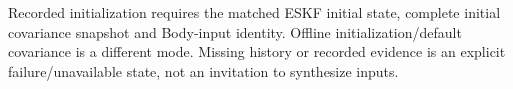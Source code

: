 Recorded initialization requires the matched ESKF initial state, complete initial covariance snapshot and Body-input identity. Offline initialization/default covariance is a different mode. Missing history or recorded evidence is an explicit failure/unavailable state, not an invitation to synthesize inputs.

